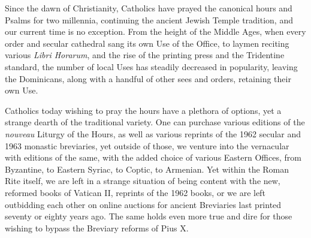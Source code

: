 




{\color{Red} }

\par Since the dawn of Christianity, Catholics have prayed the canonical hours and Psalms for two millennia, continuing the ancient Jewish Temple tradition, and our current time is no exception. From the height of the Middle Ages, when every order and secular cathedral sang its own Use of the Office, to laymen reciting various \textit{Libri Horarum}, and the rise of the printing press and the Tridentine standard, the number of local Uses has steadily decreased in popularity, leaving the Dominicans, along with a handful of other sees and orders, retaining their own Use.

Catholics today wishing to pray the hours have a plethora of options, yet a strange dearth of the traditional variety. One can purchase various editions of the \textit{nouveau} Liturgy of the Hours, as well as various reprints of the 1962 secular and 1963 monastic breviaries, yet outside of those, we venture into the vernacular with editions of the same, with the added choice of various Eastern Offices, from Byzantine, to Eastern Syriac, to Coptic, to Armenian. Yet within the Roman Rite itself, we are left in a strange situation of being content with the new, reformed books of Vatican II, reprints of the 1962 books, or we are left outbidding each other on online auctions for ancient Breviaries last printed seventy or eighty years ago. The same holds even more true and dire for those wishing to bypass the Breviary reforms of Pius X.

{\color{Red} }


